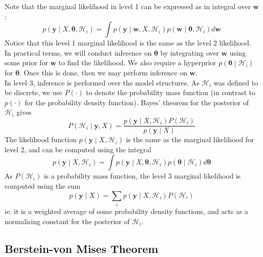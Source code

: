\documentclass[11pt]{report} %
\begin{document}
Note that the marginal likelihood in level 1 can be expressed as in integral over $\mathbf{w}$:
\begin{equation}
p\left(\mathbf{y}\middle|X, \boldsymbol{\theta}, \mathcal{H}_{i}\right) = \int p\left(\mathbf{y}\middle|\mathbf{w}, X, \mathcal{H}_{i}\right)p\left(\mathbf{w}\middle|\boldsymbol{\theta}, \mathcal{H}_{i}\right) d\mathbf{w}
\end{equation}
Notice that this level 1 marginal likelihood is the same as the level 2 likelihood. In practical terms, we will conduct inference on $\boldsymbol{\theta}$ by integrating over $\mathbf{w}$ using some prior for $\mathbf{w}$ to find the likelihood. We also require a hyperprior $p\left(\boldsymbol{\theta}\middle|\mathcal{H}_{i}\right)$ for $\boldsymbol{\theta}$. Once this is done, then we may perform inference on $\mathbf{w}$. \\

In level 3, inference is performed over the model structures. As $\mathcal{H}_{i}$ was defined to be discrete, we use $P\left(\cdot\right)$ to denote the probability mass function (in contrast to $p\left(\cdot\right)$ for the probability density function). Bayes' theorem for the posterior of $\mathcal{H}_{i}$ gives
\begin{equation}
P\left(\mathcal{H}_{i}\middle|\mathbf{y}, X\right) = \dfrac{p\left(\mathbf{y}\middle|X, \mathcal{H}_{i}\right)P\left(\mathcal{H}_{i}\right)}{p\left(\mathbf{y}\middle|X\right)}
\end{equation}
The likelihood function $p\left(\mathbf{y}\middle|X, \mathcal{H}_{i}\right)$ is the same as the marginal likelihood for level 2, and can be computed using the integral
\begin{equation}
p\left(\mathbf{y}\middle|X, \mathcal{H}_{i}\right) = \int p\left(\mathbf{y}\middle|X, \boldsymbol{\theta}, \mathcal{H}_{i}\right) p\left(\boldsymbol{\theta}\middle| \mathcal{H}_{i}\right) d\boldsymbol{\theta}
\end{equation}
As $P\left(\mathcal{H}_{i}\right)$ is a probability mass function, the level 3 marginal likelihood is computed using the sum
\begin{equation}
p\left(\mathbf{y}\middle|X\right) = \sum_{i}p\left(\mathbf{y}\middle|X, \mathcal{H}_{i}\right)P\left(\mathcal{H}_{i}\right)
\end{equation}
ie. it is a weighted average of some probability density functions, and acts as a normalising constant for the posterior of $\mathcal{H}_{i}$.

\subsection{Berstein-von Mises Theorem}
\end{document}
